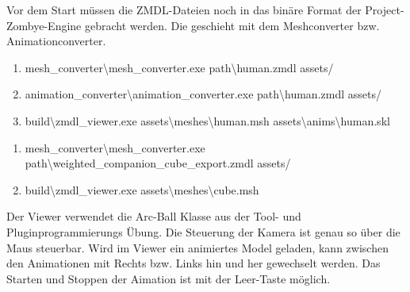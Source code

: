Vor dem Start müssen die ZMDL-Dateien noch in das binäre Format der Project-Zombye-Engine gebracht werden. Die geschieht mit dem Meshconverter bzw. Animationconverter.

\begin{enumerate}
    \item mesh\_converter\textbackslash{}mesh\_converter.exe path\textbackslash{}human.zmdl assets/
    \item animation\_converter\textbackslash{}animation\_converter.exe path\textbackslash{}human.zmdl assets/
    \item build\textbackslash{}zmdl\_viewer.exe assets\textbackslash{}meshes\textbackslash{}human.msh assets\textbackslash{}anims\textbackslash{}human.skl
\end{enumerate}

\begin{enumerate}
    \item mesh\_converter\textbackslash{}mesh\_converter.exe path\textbackslash{}weighted\_companion\_cube\_export.zmdl assets/
    \item build\textbackslash{}zmdl\_viewer.exe assets\textbackslash{}meshes\textbackslash{}cube.msh
\end{enumerate}

Der Viewer verwendet die Arc-Ball Klasse aus der Tool- und Pluginprogrammierungs Übung. Die Steuerung der Kamera ist genau so über die Maus steuerbar. Wird im Viewer ein animiertes Model geladen, kann zwischen den Animationen mit Rechts bzw. Links hin und her gewechselt werden. Das Starten und Stoppen der Aimation ist mit der Leer-Taste möglich.
